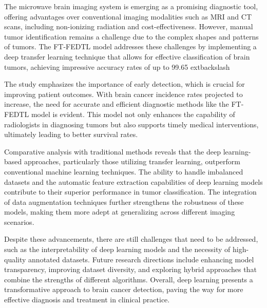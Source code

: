 \documentclass[runningheads]{llncs}
\begin{document}
The microwave brain imaging system is emerging as a promising diagnostic tool, offering advantages over conventional imaging modalities such as MRI and CT scans, including non-ionizing radiation and cost-effectiveness. However, manual tumor identification remains a challenge due to the complex shapes and patterns of tumors. The FT-FEDTL model addresses these challenges by implementing a deep transfer learning technique that allows for effective classification of brain tumors, achieving impressive accuracy rates of up to 99.65	extbackslash{}%

The study emphasizes the importance of early detection, which is crucial for improving patient outcomes. With brain cancer incidence rates projected to increase, the need for accurate and efficient diagnostic methods like the FT-FEDTL model is evident. This model not only enhances the capability of radiologists in diagnosing tumors but also supports timely medical interventions, ultimately leading to better survival rates.

Comparative analysis with traditional methods reveals that the deep learning-based approaches, particularly those utilizing transfer learning, outperform conventional machine learning techniques. The ability to handle imbalanced datasets and the automatic feature extraction capabilities of deep learning models contribute to their superior performance in tumor classification. The integration of data augmentation techniques further strengthens the robustness of these models, making them more adept at generalizing across different imaging scenarios.

Despite these advancements, there are still challenges that need to be addressed, such as the interpretability of deep learning models and the necessity of high-quality annotated datasets. Future research directions include enhancing model transparency, improving dataset diversity, and exploring hybrid approaches that combine the strengths of different algorithms. Overall, deep learning presents a transformative approach to brain cancer detection, paving the way for more effective diagnosis and treatment in clinical practice.
\end{document}
